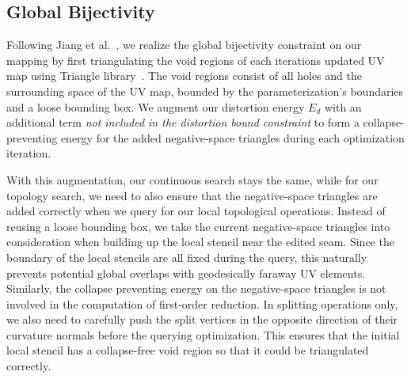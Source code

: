 \subsection{Global Bijectivity}
\label{sec:bijectivity}
Following Jiang et al.\ , we realize the global bijectivity constraint on our mapping by first triangulating the void regions of each iterations updated UV map using Triangle library~\cite{shewchuk1996triangle}. The void regions consist of all holes and the surrounding space of the UV map, bounded by the parameterization's boundaries and a loose bounding box.
We augment our distortion energy $E_d$ with an additional term \emph{not included in the distortion bound constraint} to form a collapse-preventing energy for the added negative-space triangles during each optimization iteration.

With this augmentation, our continuous search stays the same, while for our topology search, we need to also ensure that the negative-space triangles are added correctly when we query for our local topological operations.
Instead of reusing a loose bounding box, we take the current negative-space triangles into consideration when building up the local stencil near the edited seam. Since the boundary of the local stencils are all fixed during the query, this naturally prevents potential global overlaps with geodesically faraway UV elements. Similarly, the collapse preventing energy on the negative-space triangles is not involved in the computation of first-order reduction.
In splitting operations only, we also need to carefully push the split vertices in the opposite direction of their curvature normals before the querying optimization. This ensures that the initial local stencil has a collapse-free void region so that it could be triangulated correctly.



